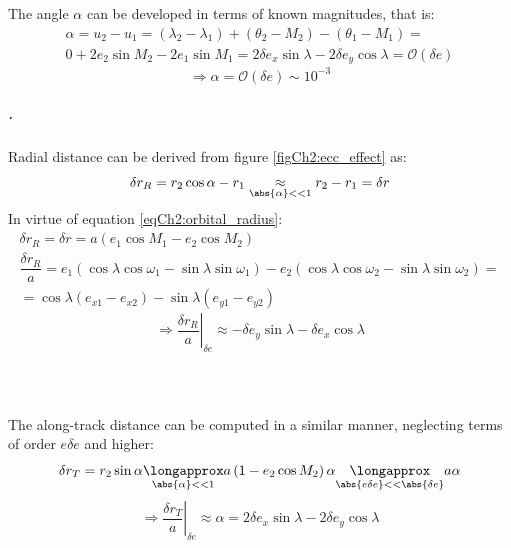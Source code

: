 			\FloatBarrier
			\indent The angle $\alpha$ can be developed in terms of known magnitudes, that is:
			\[
			\begin{array}{c}
			\alpha = u_2 - u_1 = \left(\lambda_2 - \lambda_1\right) + \left(\theta_2 - M_2\right) - \left(\theta_1 - M_1\right) = \\
			0 + 2 e_2 \sin M_2 - 2 e_1 \sin M_1 = 2 \delta e_x \sin\lambda - 2 \delta e_y \cos\lambda = \mathcal{O}(\delta e)
			\end{array}
			\]
			\begin{equation}
			\Rightarrow \alpha = \mathcal{O}(\delta e) \sim 10^{-3}
			\label{eqCh2:alpha}
			\end{equation}
			\subparagraph{ . \\}
			\indent Radial distance can be derived from figure \ref{figCh2:ecc_effect} as:
			\begin{align}
			\nonumber \delta r_R = r_2 \cos\alpha - r_1 \underset{\tiny{\abs{\alpha} << 1}}{\approx} r_2 - r_1 = \delta r
			\end{align}
			\indent In virtue of equation \eqref{eqCh2:orbital_radius}:
			\[
			\begin{array}{ccc}
			\delta r_R = \delta r = a \left(e_1 \cos M_1 - e_2 \cos M_2 \right)\\
			\dfrac{\delta r_R}{a} = e_1 \left( \cos\lambda \cos\omega_1 - \sin\lambda\sin\omega_1 \right) - e_2 \left(\cos \lambda \cos\omega_2 - \sin\lambda\sin\omega_2\right) =\\
			= \cos\lambda \left(e_{x1} - e_{x2}\right) - \sin\lambda \left(e_{y1} - e_{y2}\right) 
			\end{array}
			\]
			\begin{equation}
			\label{eqCh2:r_R_ecc}   \Rightarrow \left.\dfrac{\delta r_R}{a}\right\rvert_{\delta e} \approx - \delta e_y\sin\lambda - \delta e_x \cos\lambda
			\end{equation}
			\subparagraph{ \\}
			\indent The along-track distance can be computed in a similar manner, neglecting terms of order $e\delta e$ and higher:
			\[
			\delta r_T = r_2 \sin\alpha \underset{\tiny{\abs{\alpha} << 1}}{\longapprox} a \left(1 - e_2 \cos M_2\right) \alpha \underset{\tiny{\abs{e\delta e} << \abs{\delta e}}}{\longapprox} a\alpha
			\]
			\begin{equation}
			\label{eqCh2:r_T_ecc}\Rightarrow \left.\dfrac{\delta r_T}{a}\right\rvert_{\delta e} \approx \alpha =  2 \delta e_x \sin\lambda - 2 \delta e_y \cos\lambda
			\end{equation}
